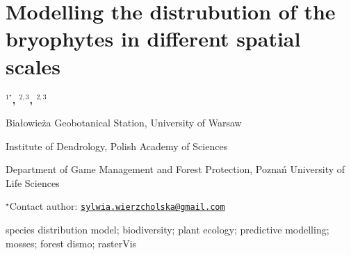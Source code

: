\documentclass[\main/boa.tex]{subfiles}
\begin{document}
\section{Modelling the distrubution of the bryophytes in different spatial scales}

\begin{center}
  {\bf {}$^{1^\star}$, $^{2, 3}$, $^{2, 3}$}
\end{center}

\vskip 0.3cm

\begin{affiliations}
\begin{enumerate}
\begin{minipage}{0.915\textwidth}
\centering
\item Białowieża Geobotanical Station, University of Warsaw \\[-2pt]
\item Institute of Dendrology, Polish Academy of Sciences \\[-2pt]
\item Department of Game Management and Forest Protection, Poznań University
of Life Sciences \\[-2pt]
\end{minipage}
\end{enumerate}
$^\star$Contact author: \href{mailto:sylwia.wierzcholska@gmail.com}{\nolinkurl{sylwia.wierzcholska@gmail.com}}\\
\end{affiliations}

\vskip 0.5cm

\begin{minipage}{0.915\textwidth}
\keywords species distribution model; biodiversity; plant ecology; predictive
modelling; mosses; forest
\packages dismo; rasterVis
\end{minipage}

\vskip 0.8cm
\end{document}
